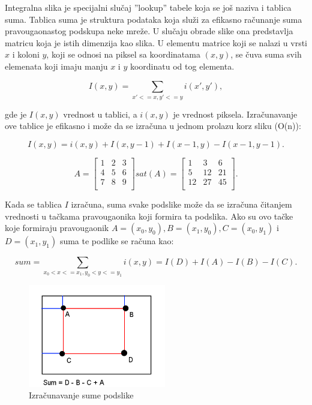 \documentclass[a4paper,12pt,titlepage]{article}
\begin{document}
Integralna slika je specijalni slučaj ''lookup'' tabele koja se još naziva i tablica suma. Tablica suma je struktura podataka koja služi za efikasno računanje suma pravougaonastog podskupa neke mreže. U slučaju obrade slike ona predstavlja matricu koja je istih dimenzija kao slika. U elementu matrice koji se nalazi u vrsti $x$ i koloni $y$, koji se odnosi na piksel sa koordinatama $(x, y)$, se čuva suma svih elemenata koji imaju manju $x$ i $y$ koordinatu od tog elementa. 

\begin{equation}\label{eq:gf17}
I(x, y) = \sum_{x' <= x, y' <= y} i(x', y'),
\end{equation}

gde je $I(x, y)$ vrednost u tablici, a $i(x, y)$ je vrednost piksela. Izračunavanje ove tablice je efikasno i može da se izračuna u jednom prolazu korz sliku (O(n)):

\begin{equation}\label{eq:gf18}
I(x, y) = i(x, y) + I(x, y - 1) + I(x - 1, y) - I(x - 1, y - 1).
\end{equation}

\begin{equation}\label{eq:gf18}
 A
 =
\begin{bmatrix}
     1 & 2 & 3 \\
     4 & 5 & 6 \\
     7 & 8 & 9 \\
\end{bmatrix}
sat(A)
=
\begin{bmatrix}
     1 & 3 & 6 \\
     5 & 12 & 21 \\
     12 & 27 & 45 \\
\end{bmatrix}
.\end{equation}

Kada se tablica $I$  izračuna, suma svake podslike može da se izračuna čitanjem vrednosti u tačkama pravougaonika koji formira ta podslika. Ako su ovo tačke koje formiraju pravougaonik $A = (x_0, y_0), B = (x_1, y_0), C = (x_0, y_1)$ i $D = (x_1, y_1)$ suma te podlike se računa kao:

\begin{equation}\label{eq:gf19}
sum = \sum_{x_0 < x <= x_1, y_0 < y <= y_1} i(x, y) = I(D) + I(A) - I(B) - I(C).
\end{equation} 

\begin{figure}[ht!]
\centering
\includegraphics[width=60mm]{img/sat.png}
\caption{Izračunavanje sume podslike}
\label{overflow}
\end{figure}
\end{document}

